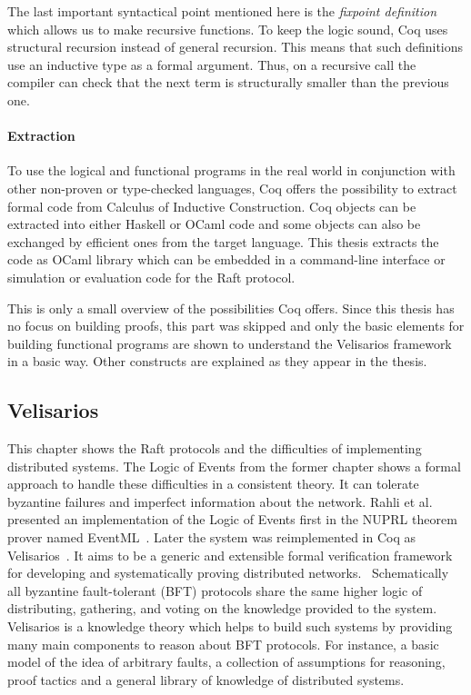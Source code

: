 The last important syntactical point mentioned here is the \textit{fixpoint definition}
which allows us to make recursive functions. To keep the logic sound, Coq uses
structural recursion instead of general recursion. This means that
such definitions use an inductive type as a formal argument.
Thus, on a recursive call the compiler can check that the next
term is structurally smaller than the previous one.~\cite{paulin2011introduction}

\paragraph{Extraction}
To use the logical and functional programs in the real world in conjunction
with other non-proven or type-checked languages, Coq offers
the possibility to extract formal code from Calculus of Inductive Construction.
Coq objects can be extracted into either Haskell or OCaml code and
some objects can also be exchanged by efficient ones from the target
language. This thesis extracts the code as OCaml library which can be
embedded in a command-line interface or simulation or evaluation
code for the Raft protocol.~\cite{the_coq_development_team_2019_2554024}

This is only a small overview of the possibilities Coq offers. Since
this thesis has no focus on building proofs, this part was skipped and
only the basic elements for building functional programs are shown to
understand the Velisarios framework in a basic way. Other constructs
are explained as they appear in the thesis.


\subsection{Velisarios}
This chapter shows the Raft protocols and the difficulties of
implementing distributed systems. The Logic of Events from the former
chapter shows a formal approach to handle these difficulties in
a consistent theory. It can tolerate byzantine failures and
imperfect information about the network. Rahli et al. presented
an implementation of the Logic of Events first in the NUPRL
theorem prover named EventML~\cite{rahli2017eventml}. Later
the system was reimplemented in Coq as Velisarios~\cite{rahli2018velisarios}.
It aims to be a generic and extensible formal verification framework
for developing and systematically proving distributed networks.~\cite{rahli2018velisarios}
Schematically all byzantine fault-tolerant (BFT) protocols share the same
higher logic of distributing, gathering, and voting on the knowledge
provided to the system. Velisarios is a knowledge theory which
helps to build such systems by providing many main components
to reason about BFT protocols. For instance, a basic model
of the idea of arbitrary faults, a collection of assumptions
for reasoning, proof tactics and a general library of
knowledge of distributed systems.~\cite{rahli2018velisarios}

